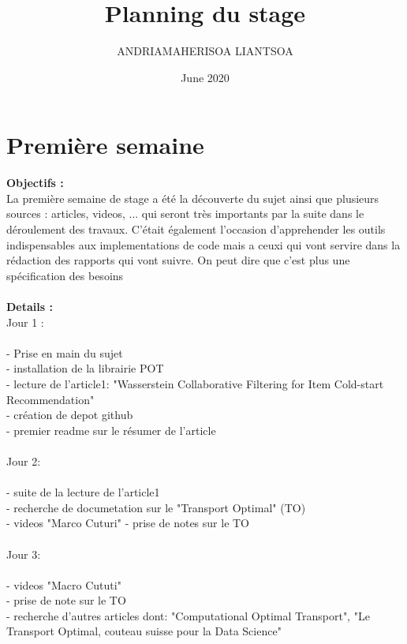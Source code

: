 \documentclass{article}
\title{Planning du stage}
\author{ANDRIAMAHERISOA LIANTSOA }
\date{June 2020}
\begin{document}
\maketitle

\section{Première semaine}

    \textbf{Objectifs : }\newline\\
    La première semaine de stage a été la découverte du sujet ainsi que plusieurs sources : articles, videos, ... qui seront très importants par la suite dans le déroulement des travaux.\newline
    C'était également l'occasion d'apprehender les outils indispensables aux implementations de code mais a ceuxi qui vont servire dans la rédaction des rapports qui vont suivre.\newline
    On peut dire que c'est plus une spécification des besoins\\\\
    \textbf{Details : }\newline\\
    Jour 1 : \\\\
        - Prise en main du sujet\\
        - installation de la librairie POT\\
        - lecture de l'article1: "Wasserstein Collaborative Filtering for Item Cold-start Recommendation"\\
        - création de depot github\\ 
        - premier readme sur le résumer de l'article\\\\
    Jour 2: \\\\
        - suite de la lecture de l'article1\\
        - recherche de documetation sur le "Transport Optimal" (TO)\\
        - videos "Marco Cuturi"
        - prise de notes sur le TO\\\\
    Jour 3: \\\\
        - videos "Macro Cututi"\\
        - prise de note sur le TO\\
        - recherche d'autres articles dont: "Computational Optimal Transport", "Le Transport Optimal, couteau suisse pour la Data Science"\\
\end{document}
